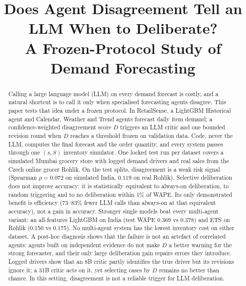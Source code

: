 \documentclass[conference]{IEEEtran}
\begin{document}
\title{Does Agent Disagreement Tell an LLM When to Deliberate?\\
A Frozen-Protocol Study of Demand Forecasting}

\author{
}

\maketitle

\begin{abstract}
Calling a large language model (LLM) on every demand forecast is costly, and a natural shortcut is
to call it only when specialised forecasting agents disagree. This paper tests that idea under a
frozen protocol. In RetailSense, a LightGBM Historical agent and Calendar, Weather and Trend agents
forecast daily item demand; a confidence-weighted disagreement score $D$ triggers an LLM critic and
one bounded revision round when $D$ reaches a threshold frozen on validation data. Code, never the
LLM, computes the final forecast and the order quantity, and every system passes through one
$(s,S)$ inventory simulator. One locked test run per dataset covers a simulated Mumbai grocery store
with logged demand drivers and real sales from the Czech online grocer Rohlik. On the test splits,
disagreement is a weak risk signal (Spearman $\rho=0.072$ on simulated India, $0.119$ on real
Rohlik). Selective deliberation does not improve accuracy: it is statistically equivalent to
always-on deliberation, to random triggering and to no deliberation within 1\% of WAPE. Its only
demonstrated benefit is efficiency (73--83\% fewer LLM calls than always-on at that equivalent
accuracy), not a gain in accuracy. Stronger single models beat every multi-agent variant: an
all-features LightGBM on India (test WAPE 0.369 vs 0.378) and ETS on Rohlik (0.150 vs 0.175). No
multi-agent system has the lowest inventory cost on either dataset.
A post-hoc diagnosis shows that the failure is not an artefact of correlated agents: agents built
on independent evidence do not make $D$ a better warning for the strong forecaster, and their only
large deliberation gain repairs errors they introduce. Logged drivers show that an 8B critic partly
identifies the true driver but its revisions ignore it; a 31B critic acts on it, yet selecting cases
by $D$ remains no better than chance. In this setting, disagreement is not a reliable trigger for
LLM deliberation.
\end{abstract}
\end{document}
